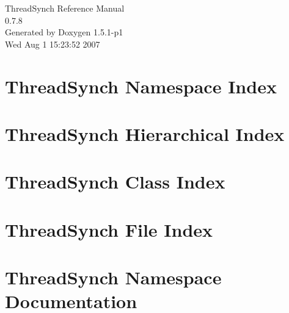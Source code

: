 \documentclass[a4paper]{book}
\begin{document}
\begin{titlepage}
\vspace*{7cm}
\begin{center}
{\Large Thread\-Synch Reference Manual\\[1ex]\large 0.7.8 }\\
\vspace*{1cm}
{\large Generated by Doxygen 1.5.1-p1}\\
\vspace*{0.5cm}
{\small Wed Aug 1 15:23:52 2007}\\
\end{center}
\end{titlepage}
\clearemptydoublepage
{}
\tableofcontents
\clearemptydoublepage
{}
\chapter{Thread\-Synch Namespace Index}

\chapter{Thread\-Synch Hierarchical Index}

\chapter{Thread\-Synch Class Index}

\chapter{Thread\-Synch File Index}

\chapter{Thread\-Synch Namespace Documentation}




\end{document}
